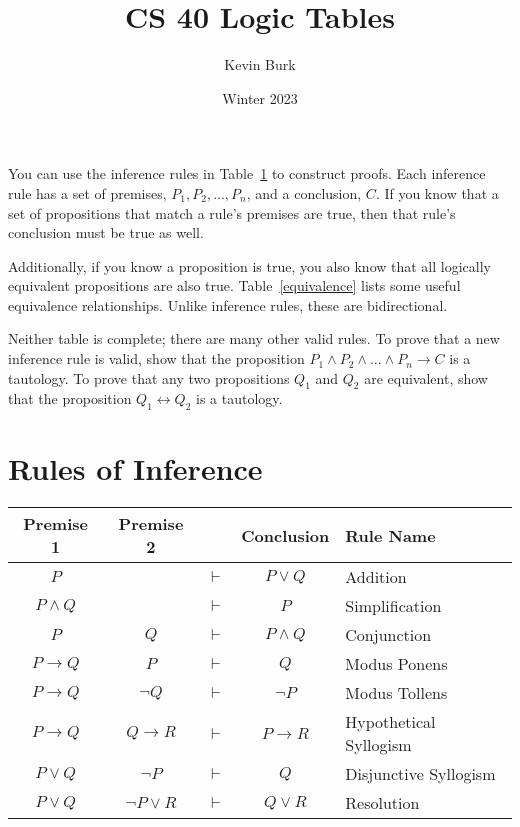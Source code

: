 \documentclass{article}
\title{CS 40 Logic Tables}
\author{Kevin Burk}
\date{Winter 2023}
\begin{document}
\maketitle

You can use the inference rules in Table~\ref{deduction} to construct proofs.
Each inference rule has a set of premises, $P_1, P_2, ..., P_n$, and a conclusion, $C$.
If you know that a set of propositions that match a rule's premises are true, then that rule's conclusion must be true as well.

Additionally, if you know a proposition is true, you also know that all logically equivalent propositions are also true.
Table~\ref{equivalence} lists some useful equivalence relationships.
Unlike inference rules, these are bidirectional.

Neither table is complete; there are many other valid rules.
To prove that a new inference rule is valid, show that the proposition $P_1 \wedge P_2 \wedge ... \wedge P_n \rightarrow C$ is a tautology.
To prove that any two propositions $Q_1$ and $Q_2$ are equivalent, show that the proposition $Q_1 \leftrightarrow Q_2$ is a tautology.

\vspace{2em}
\section{Rules of Inference}
\label{deduction}

\renewcommand{\arraystretch}{1.25}
\begin{tabularx}{\textwidth}{ccccX}
   Premise 1 & Premise 2 & & Conclusion & Rule Name \\
    \hline
    $P$ & & $\vdash$ & $P \vee Q$ & Addition \\
    $P \wedge Q$ & & $\vdash$ & $P$ & Simplification \\
    $P$ & $Q$ & $\vdash$ & $P \wedge Q$ & Conjunction \\
    $P \rightarrow Q$ & $P$ & $\vdash$ & $Q$ & Modus Ponens \\
    $P \rightarrow Q$ & $\neg Q$ & $\vdash$ & $\neg P$ & Modus Tollens \\
    $P \rightarrow Q$ & $Q \rightarrow R$ & $\vdash$ & $P \rightarrow R$ & Hypothetical Syllogism \\
    $P \vee Q$ & $\neg P$ & $\vdash$ & $Q$ & Disjunctive Syllogism \\
    $P \vee Q$ & $\neg P \vee R$ & $\vdash$ & $Q \vee R$ & Resolution \\
\end{tabularx}
\end{document}
